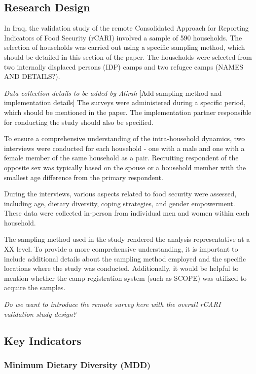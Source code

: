 \documentclass[11pt,harvard]{article}
\begin{document}
\subsection{Research Design}

In Iraq, the validation study of the remote Consolidated Approach for Reporting Indicators of Food Security (rCARI) involved a sample of 590 households. The selection of households was carried out using a specific sampling method, which should be detailed in this section of the paper. The households were selected from two internally displaced persons (IDP) camps and two refugee camps (NAMES AND DETAILS?). 

\emph{Data collection details to be added by Alirah} 
[Add sampling method and implementation details] The surveys were administered during a specific period, which should be mentioned in the paper. The implementation partner responsible for conducting the study should also be specified.

To ensure a comprehensive understanding of the intra-household dynamics, two interviews were conducted for each household - one with a male and one with a female member of the same household as a pair. Recruiting respondent of the opposite sex was typically based on the spouse or a household member with the smallest age difference from the primary respondent.

During the interviews, various aspects related to food security were assessed, including age, dietary diversity, coping strategies, and gender empowerment. These data were collected in-person from individual men and women within each household.

The sampling method used in the study rendered the analysis representative at a XX level. To provide a more comprehensive understanding, it is important to include additional details about the sampling method employed and the specific locations where the study was conducted. Additionally, it would be helpful to mention whether the camp registration system (such as SCOPE) was utilized to acquire the samples.

\emph{Do we want to introduce the remote survey here with the overall rCARI validation study design? } 


\subsection{Key Indicators}

\subsubsection{Minimum Dietary Diversity (MDD)}
\end{document}
